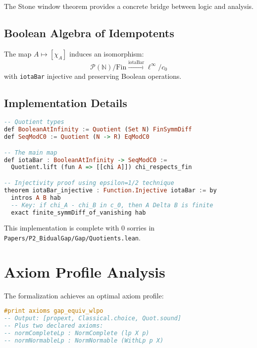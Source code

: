\documentclass{lmcs}
\begin{document}
The Stone window theorem provides a concrete bridge between logic and analysis.

\subsection{Boolean Algebra of Idempotents}

\begin{theorem}
The map $A \mapsto [\chi_A]$ induces an isomorphism:
\[
\mathcal{P}(\mathbb{N})/\mathrm{Fin} \xrightarrow{\text{iotaBar}} \ell^\infty/c_0
\]
with \texttt{iotaBar} injective and preserving Boolean operations.
\end{theorem}

\subsection{Implementation Details}

\begin{lstlisting}[language=Haskell, caption={Stone window implementation}]
-- Quotient types
def BooleanAtInfinity := Quotient (Set N) FinSymmDiff
def SeqModC0 := Quotient (N -> R) EqModC0

-- The main map
def iotaBar : BooleanAtInfinity -> SeqModC0 := 
  Quotient.lift (fun A => [[chi A]]) chi_respects_fin

-- Injectivity proof using epsilon=1/2 technique
theorem iotaBar_injective : Function.Injective iotaBar := by
  intros A B hab
  -- Key: if chi_A - chi_B in c_0, then A Delta B is finite
  exact finite_symmDiff_of_vanishing hab
\end{lstlisting}

This implementation is complete with 0 sorries in \texttt{Papers/P2\_BidualGap/Gap/Quotients.lean}.

\section{Axiom Profile Analysis}\label{sec:axioms}

The formalization achieves an optimal axiom profile:

\begin{lstlisting}[language=Haskell, caption={Axiom analysis}]
#print axioms gap_equiv_wlpo
-- Output: [propext, Classical.choice, Quot.sound]
-- Plus two declared axioms:
-- normCompleteLp : NormComplete (lp X p)
-- normNormableLp : NormNormable (WithLp p X)
\end{lstlisting}
\end{document}
